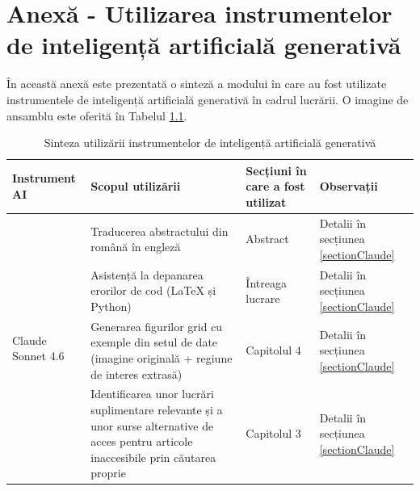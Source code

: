 \documentclass[12pt,a4paper]{report}
\theoremstyle{definition}
\theoremstyle{remark}
\begin{document}
\newpage
\tableofcontents
\newpage
























\appendix
\chapter{Anexă - Utilizarea instrumentelor de inteligență artificială generativă}
\label{genAIUsage}
În această anexă este prezentată o sinteză a modului în care au fost utilizate instrumentele de inteligență artificială generativă în cadrul lucrării. O imagine de ansamblu este oferită în Tabelul \ref{tab:genAIOverview}.

\begin{table}[h!]
    \centering
    \begin{tabularx}{\textwidth}{|l|X|X|X|}
            \hline \rowcolor{blue!20}
         Instrument AI& Scopul utilizării & Secțiuni în care a fost utilizat & Observații \\\hline
         \multirow{4}{*}{Claude Sonnet 4.6} & Traducerea abstractului din română în engleză & Abstract & Detalii în secțiunea \ref{sectionClaude} \\ \cline{2-4}

          & Asistență la depanarea erorilor de cod (LaTeX și Python) & Întreaga lucrare & Detalii în secțiunea \ref{sectionClaude} \\ \cline{2-4}

          & Generarea figurilor grid cu exemple din setul de date (imagine originală + regiune de interes extrasă) & Capitolul 4 & Detalii în secțiunea \ref{sectionClaude} \\ \cline{2-4}

          & Identificarea unor lucrări suplimentare relevante și a unor surse alternative de acces pentru articole inaccesibile prin căutarea proprie & Capitolul 3 & Detalii în secțiunea \ref{sectionClaude} \\ \hline
    \end{tabularx}
    \caption{Sinteza utilizării instrumentelor de inteligență artificială generativă}
    \label{tab:genAIOverview}
\end{table}
\end{document}
